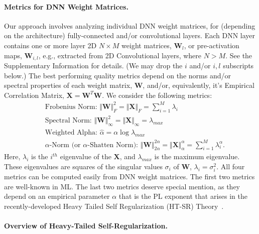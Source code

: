 \paragraph{Metrics for DNN Weight Matrices.}

Our approach involves analyzing individual DNN weight matrices, for (depending on the architecture) fully-connected and/or convolutional layers.
Each DNN layer contains one or more layer 2D  $N\times M$ weight matrices, $\mathbf{W}_{l}$, or pre-activation maps, $\mathbf{W}_{i,l}$, e.g., extracted from 2D Convolutional layers, where $N > M$.
See the Supplementary Information
for details.
(We may drop the $i$ and/or $i,l$ subscripts below.)
The best performing quality metrics depend on the norms and/or spectral properties of each weight matrix,
$\mathbf{W}$, and/or, equivalently, it's Empirical Correlation Matrix, $\mathbf{X}=\mathbf{W}^{T}\mathbf{W}$.
We consider the following metrics:
\begin{eqnarray}
& & \text{Frobenius Norm: $\Vert\mathbf{W}\Vert^{2}_{F}=\Vert\mathbf{X}\Vert_{F}=\sum\nolimits_{i=1}^{M} \lambda_{i}$ } \\
& & \text{Spectral Norm: $\Vert\mathbf{W}\Vert_{\infty}^{2}=\Vert\mathbf{X}\Vert_{\infty}=\lambda_{max}$ } \\
& & \text{Weighted Alpha: $\hat{\alpha}=\alpha\log\lambda_{max}$ } \\
& & \text{$\alpha$-Norm (or $\alpha$-Shatten Norm): $\Vert\mathbf{W}\Vert^{2\alpha}_{2\alpha}=\Vert\mathbf{X}\Vert^{\alpha}_{\alpha}=\sum\nolimits_{i=1}^{M}\lambda_{i}^{\alpha}$. }
\end{eqnarray}
Here, $\lambda_{i}$ is the $i^{th}$ eigenvalue of the $\mathbf{X}$, and $\lambda_{max}$ is the maximum eigenvalue.
These eigenvalues are squares of the singular values $\sigma_{i}$ of $\mathbf{W}$, $\lambda_{i}=\sigma^{2}_{i}$.
All four metrics can be computed easily from DNN weight matrices.
The first two metrics are well-known in ML.
The last two metrics deserve special mention, as they depend on an empirical parameter $\alpha$ that is the PL exponent that arises in the recently-developed Heavy Tailed Self Regularization (HT-SR) Theory~\cite{MM18_TR, MM19_HTSR_ICML, MM20_SDM}.


\paragraph{Overview of Heavy-Tailed Self-Regularization.}

